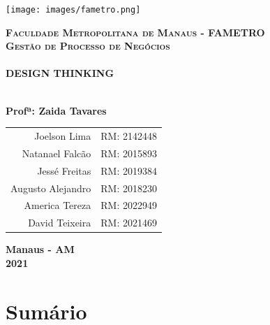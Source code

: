 \documentclass[a4paper]{article}
\begin{document}

\begin{titlepage}
\centering \texttt{[image: images/fametro.png]}

\textsc{\textbf{\Large Faculdade Metropolitana de Manaus - FAMETRO}}\\[0.5cm]
\textsc{\textbf{\Large Gestão de Processo de Negócios}}\\[0.5cm]

\vspace{1.0cm}
\HRule \\[0.4cm]
{\huge \textbf{DESIGN THINKING}} \\[0.25cm]
\HRule \\[1.0cm]
\vspace{1.0cm}

\textbf{\Large Profª: Zaida Tavares} \\[0.4cm]
\vspace{0.5cm}
\begin{flushright}
    \begin{tabular}{r|l}
            Joelson Lima & RM: 2142448 \\
            Natanael Falcão & RM: 2015893 \\
            Jessé Freitas & RM: 2019384 \\
            Augusto Alejandro & RM: 2018230 \\
            America Tereza & RM: 2022949 \\
            David Teixeira & RM: 2021469
    \end{tabular}
\end{flushright}

\vfill
\textbf{\large Manaus - AM}\\[0.5cm]
\textbf{\large 2021}

\end{titlepage}

\section{Sumário}
\end{document}
